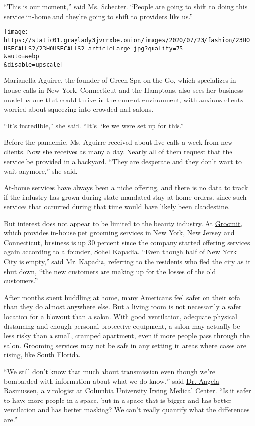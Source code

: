 ``This is our moment,'' said Ms. Schecter. ``People are going to shift
to doing this service in-home and they're going to shift to providers
like us.''

\texttt{[image: https://static01.graylady3jvrrxbe.onion/images/2020/07/23/fashion/23HOUSECALLS2/23HOUSECALLS2-articleLarge.jpg?quality=75\\\&auto=webp\\\&disable=upscale]}

Marianella Aguirre, the founder of Green Spa on the Go, which
specializes in house calls in New York, Connecticut and the Hamptons,
also sees her business model as one that could thrive in the current
environment, with anxious clients worried about squeezing into crowded
nail salons.

``It's incredible,'' she said. ``It's like we were set up for this.''

Before the pandemic, Ms. Aguirre received about five calls a week from
new clients. Now she receives as many a day. Nearly all of them request
that the service be provided in a backyard. ``They are desperate and
they don't want to wait anymore,'' she said.

At-home services have always been a niche offering, and there is no data
to track if the industry has grown during state-mandated stay-at-home
orders, since such services that occurred during that time would have
likely been clandestine.

But interest does not appear to be limited to the beauty industry. At
\href{https://www.groomit.me/}{Groomit}, which provides in-house pet
grooming services in New York, New Jersey and Connecticut, business is
up 30 percent since the company started offering services again
according to a founder, Sohel Kapadia. ``Even though half of New York
City is empty,'' said Mr. Kapadia, referring to the residents who fled
the city as it shut down, ``the new customers are making up for the
losses of the old customers.''

After months spent huddling at home, many Americans feel safer on their
sofa than they do almost anywhere else. But a living room is not
necessarily a safer location for a blowout than a salon. With good
ventilation, adequate physical distancing and enough personal protective
equipment, a salon may actually be less risky than a small, cramped
apartment, even if more people pass through the salon. Grooming services
may not be safe in any setting in areas where cases are rising, like
South Florida.

``We still don't know that much about transmission even though we're
bombarded with information about what we do know,'' said
\href{https://www.publichealth.columbia.edu/research/center-infection-and-immunity/angela-rasmussen-phd}{Dr.
Angela Rasmussen}, a virologist at Columbia University Irving Medical
Center. ``Is it safer to have more people in a space, but in a space
that is bigger and has better ventilation and has better masking? We
can't really quantify what the differences are.''

